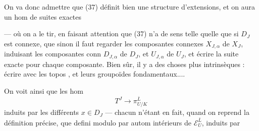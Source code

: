 
On va donc admettre que (37) définit bien une structure d'extensions, et on aura un hom de suites exactes


--- où on a  le tir, en faisant attention que (37) n'a de sens telle quelle que si $D_J$ est connexe,  que sinon il faut regarder les composantes connexes $X_{J,\alpha}$ de $X_J$, induisant les composantes conn $D_{J,\alpha}$ de $D_J$, et $U_{J,\alpha}$ de $U_J$, et écrire la suite exacte pour chaque composante. Bien sûr, il y a des choses plus intrinsèques : écrire avec les topos , et leurs groupoïdes fondamentaux....

On voit ainsi que les hom
\[
\tag{39}
T^J\longrightarrow\pi_{U/K}^{\bar L}
\]
induits par les différents $x\in D_J$ --- chacun n'étant en fait, quand on reprend la définition précise, que defini modulo   par autom intérieurs de $\mathcal E_U^{\bar L}$, induits par

